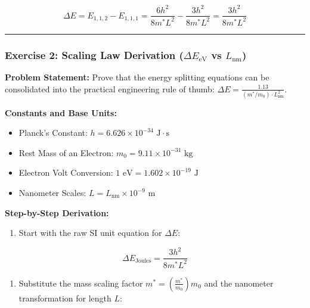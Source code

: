 \documentclass[
]{article}
\providecommand{\tightlist}{%
  \setlength{\itemsep}{0pt}\setlength{\parskip}{0pt}}
\begin{document}
\[\Delta E = E_{1,1,2} - E_{1,1,1} = \frac{6h^2}{8m^* L^2} - \frac{3h^2}{8m^* L^2} = \frac{3h^2}{8m^* L^2}\]

\begin{center}\rule{0.5\linewidth}{0.5pt}\end{center}

\subsubsection{\texorpdfstring{Exercise 2: Scaling Law Derivation
(\(\Delta E_{\text{eV}}\) vs
\(L_{\text{nm}}\))}{Exercise 2: Scaling Law Derivation (\textbackslash Delta E\_\{\textbackslash text\{eV\}\} vs L\_\{\textbackslash text\{nm\}\})}}\label{exercise-2-scaling-law-derivation-delta-e_textev-vs-l_textnm}

\textbf{Problem Statement:} Prove that the energy splitting equations
can be consolidated into the practical engineering rule of thumb:
\(\Delta E = \frac{1.13}{(m^*/m_0) \cdot L_{\text{nm}}^2}\).

\textbf{Constants and Base Units:}

\begin{itemize}
\tightlist
\item
  Planck's Constant:
  \(h = 6.626 \times 10^{-34} \text{ J}\cdot\text{s}\)
\item
  Rest Mass of an Electron: \(m_0 = 9.11 \times 10^{-31} \text{ kg}\)
\item
  Electron Volt Conversion:
  \(1 \text{ eV} = 1.602 \times 10^{-19} \text{ J}\)
\item
  Nanometer Scales: \(L = L_{\text{nm}} \times 10^{-9} \text{ m}\)
\end{itemize}

\textbf{Step-by-Step Derivation:}

\begin{enumerate}
\def\labelenumi{\arabic{enumi}.}
\tightlist
\item
  Start with the raw SI unit equation for \(\Delta E\):
\end{enumerate}

\[\Delta E_{\text{Joules}} = \frac{3 h^2}{8 m^* L^2}\]

\begin{enumerate}
\def\labelenumi{\arabic{enumi}.}
\setcounter{enumi}{1}
\tightlist
\item
  Substitute the mass scaling factor
  \(m^* = \left(\frac{m^*}{m_0}\right)m_0\) and the nanometer
  transformation for length \(L\):
\end{enumerate}
\end{document}
